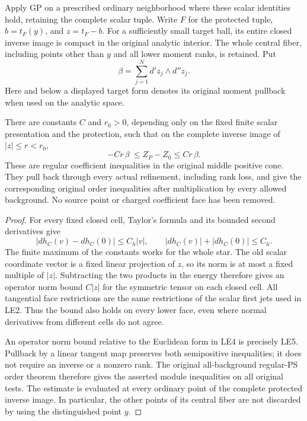 Apply GP on a prescribed ordinary neighborhood where these
scalar identities hold, retaining the complete scalar tuple.
Write $F$ for the protected tuple, $b=t_F(y)$, and
$z=t_F-b$.  For a sufficiently small target ball, its entire
closed inverse image is compact in the original analytic
interior.  The whole central fiber, including points other
than $y$ and all lower moment ranks, is retained.  Put
\[
              \beta=\sum_{j=1}^{N}d'z_j\wedge d''z_j.
 \tag{LE4}
\]
Here and below a displayed target form denotes its original
moment pullback when used on the analytic space.

\begin{lemma}
\label{lem:r13-leading-energy-full-order}
There are constants $C$ and $r_0>0$, depending only on the
fixed finite scalar presentation and the protection, such that
on the complete inverse image of $|z|\le r<r_0$,
\[
                  -Cr\,\beta\ \le Z_P-Z_0\le Cr\,\beta.
 \tag{LE5}
\]
These are regular coefficient inequalities in the original
middle positive cone.  They pull back through every actual
refinement, including rank loss, and give the corresponding
original order inequalities after multiplication by every
allowed background.  No source point or charged coefficient
face has been removed.
\end{lemma}

\begin{proof}
For every fixed closed cell, Taylor's formula and its bounded
second derivatives give
\[
   |d h_C(v)-d h_C(0)|\le C_h|v|,
              \qquad |d h_C(v)|+|d h_C(0)|\le C_h.
 \tag{LE6}
\]
The finite maximum of the constants works for the whole star.
The old scalar coordinate vector is a fixed linear projection
of $z$, so its norm is at most a fixed multiple of $|z|$.
Subtracting the two products in the energy therefore gives
an operator norm bound $C|z|$ for the symmetric tensor on
each closed cell.  All tangential face restrictions are the
same restrictions of the scalar first jets used in LE2.
Thus the bound also holds on every lower face, even where
normal derivatives from different cells do not agree.

An operator norm bound relative to the Euclidean form in LE4
is precisely LE5.  Pullback by a linear tangent map preserves
both semipositive inequalities; it does not require an inverse
or a nonzero rank.  The original all-background regular-PS
order theorem therefore gives the asserted module inequalities
on all original tests.  The estimate is evaluated at every
ordinary point of the complete protected inverse image.  In
particular, the other points of its central fiber are not
discarded by using the distinguished point $y$.
\end{proof}

